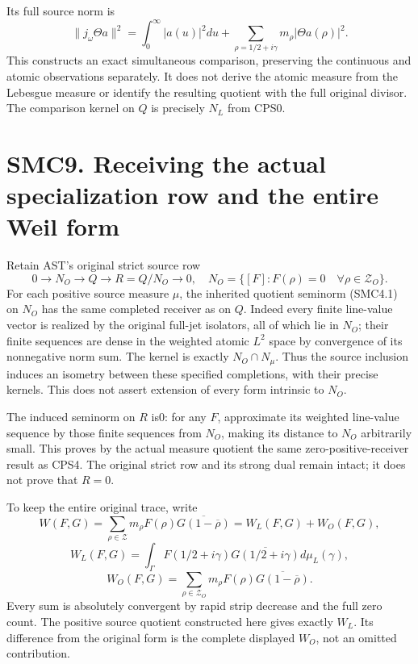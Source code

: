 Its full source norm is \[
\|j_\omega\Theta a\|^2
=\int_0^\infty|a(u)|^2du
+\sum_{\rho=1/2+i\gamma}m_\rho|\Theta a(\rho)|^2.
\tag{SMC8.3}
\] This constructs an exact simultaneous comparison, preserving the
continuous and atomic observations separately. It does not derive the
atomic measure from the Lebesgue measure or identify the resulting
quotient with the full original divisor. The comparison kernel on \(Q\)
is precisely \(N_L\) from CPS0.

\section{SMC9. Receiving the actual specialization row and the entire
Weil
form}\label{smc9.-receiving-the-actual-specialization-row-and-the-entire-weil-form}

Retain AST's original strict source row \[
0\longrightarrow N_O\longrightarrow Q\longrightarrow R=Q/N_O\longrightarrow0,
\quad N_O=\{[F]:F(\rho)=0\quad\forall\rho\in\mathscr Z_O\}.
\tag{SMC9.1}
\] For each positive source measure \(\mu\), the inherited quotient
seminorm (SMC4.1) on \(N_O\) has the same completed receiver as on
\(Q\). Indeed every finite line-value vector is realized by the original
full-jet isolators, all of which lie in \(N_O\); their finite sequences
are dense in the weighted atomic \(L^2\) space by convergence of its
nonnegative norm sum. The kernel is exactly \(N_O\cap N_\mu\). Thus the
source inclusion induces an isometry between these specified
completions, with their precise kernels. This does not assert extension
of every form intrinsic to \(N_O\).

The induced seminorm on \(R\) is0: for any \(F\), approximate its
weighted line-value sequence by those finite sequences from \(N_O\),
making its distance to \(N_O\) arbitrarily small. This proves by the
actual measure quotient the same zero-positive-receiver result as CPS4.
The original strict row and its strong dual remain intact; it does not
prove that \(R=0\).

To keep the entire original trace, write \[
W(F,G)=\sum_{\rho\in\mathscr Z}m_\rho F(\rho)\overline{G(1-\overline\rho)}
=W_L(F,G)+W_O(F,G),
\] \[
W_L(F,G)=\int_\Gamma F(1/2+i\gamma)\overline{G(1/2+i\gamma)}d\mu_L(\gamma),
\] \[
W_O(F,G)=\sum_{\rho\in\mathscr Z_O}m_\rho F(\rho)\overline{G(1-\overline\rho)}.
\tag{SMC9.2}
\] Every sum is absolutely convergent by rapid strip decrease and the
full zero count. The positive source quotient constructed here gives
exactly \(W_L\). Its difference from the original form is the complete
displayed \(W_O\), not an omitted contribution.

